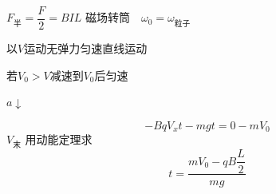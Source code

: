 \underline{$F_{\text{半}}=\dfrac{F}{2}=BIL$}  \quad {} %
磁场转筒　$\omega_0=\omega_{\text{粒子}}$ %
\begin{problem}
\begin{solution}
以$V$运动无弹力匀速直线运动

若$V_0>V$\quad 减速到$V_0$后匀速 %

$a\downarrow$
\end{solution}
\end{problem}
\begin{problem}
\begin{solution}
\[ -BqV_xt-mgt=0-mV_0 \]
$V_{\text{末}}$ 用动能定理求
\[ t=\dfrac{mV_0-qB\dfrac{L}{2}}{mg} \]
\end{solution}
\end{problem}
